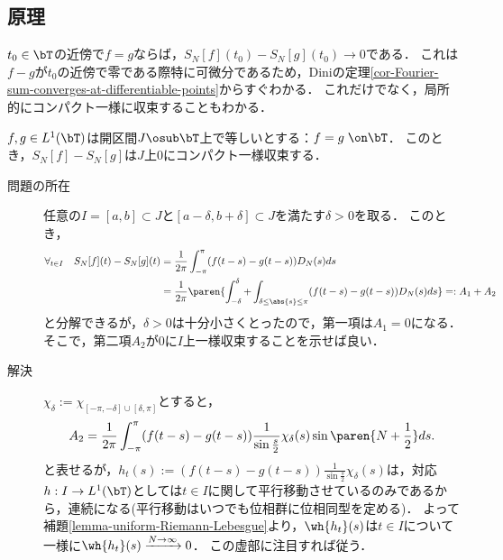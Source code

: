 \documentclass[uplatex,dvipdfmx]{jsreport}
\begin{document}
\subsection{原理}

\begin{tcolorbox}[colframe=ForestGreen, colback=ForestGreen!10!white,breakable,colbacktitle=ForestGreen!40!white,coltitle=black,fonttitle=\bfseries\sffamily,
title=]
    $t_0\in\bT$の近傍で$f=g$ならば，$S_N[f](t_0)-S_N[g](t_0)\to0$である．
    これは$f-g$が$t_0$の近傍で零である際特に可微分であるため，Diniの定理\ref{cor-Fourier-sum-converges-at-differentiable-points}からすぐわかる．
    これだけでなく，局所的にコンパクト一様に収束することもわかる．
\end{tcolorbox}

\begin{theorem}\label{thm-Riemann-locality}
    $f,g\in L^1(\bT)$は開区間$J\osub\bT$上で等しいとする：$f=g\;\on\bT$．
    このとき，$S_N[f]-S_N[g]$は$J$上$0$にコンパクト一様収束する．
\end{theorem}
\begin{Proof}\mbox{}
    \begin{description}
        \item[問題の所在] 任意の$I=[a,b]\subset J$と$[a-\delta,b+\delta]\subset J$を満たす$\delta>0$を取る．
        このとき，
        \begin{align*}
            \forall_{t\in I}\quad S_N[f](t)-S_N[g](t)&=\frac{1}{2\pi}\int^\pi_{-\pi}(f(t-s)-g(t-s))D_N(s)ds\\
            &=\frac{1}{2\pi}\paren{\int^\delta_{-\delta}+\int_{\delta\le\abs{s}\le\pi}(f(t-s)-g(t-s))D_N(s)ds}=:A_1+A_2
        \end{align*}
        と分解できるが，$\delta>0$は十分小さくとったので，第一項は$A_1=0$になる．そこで，第二項$A_2$が$0$に$I$上一様収束することを示せば良い．
        \item[解決] $\chi_\delta:=\chi_{[-\pi,-\delta]\cup[\delta,\pi]}$とすると，
        \[A_2=\frac{1}{2\pi}\int^\pi_{-\pi}(f(t-s)-g(t-s))\frac{1}{\sin\frac{s}{2}}\chi_{\delta}(s)\sin\paren{N+\frac{1}{2}}ds.\]
        と表せるが，$h_t(s):=(f(t-s)-g(t-s))\frac{1}{\sin\frac{s}{2}}\chi_{\delta}(s)$は，対応$h:I\to L^1(\bT)$としては$t\in I$に関して平行移動させているのみであるから，連続になる(平行移動はいつでも位相群に位相同型を定める)．
        よって補題\ref{lemma-uniform-Riemann-Lebesgue}より，$\wh{h_t}(s)$は$t\in I$について一様に$\wh{h_t}(s)\xrightarrow{N\to\infty}0$．
        この虚部に注目すれば従う．
    \end{description}
\end{Proof}
\end{document}
